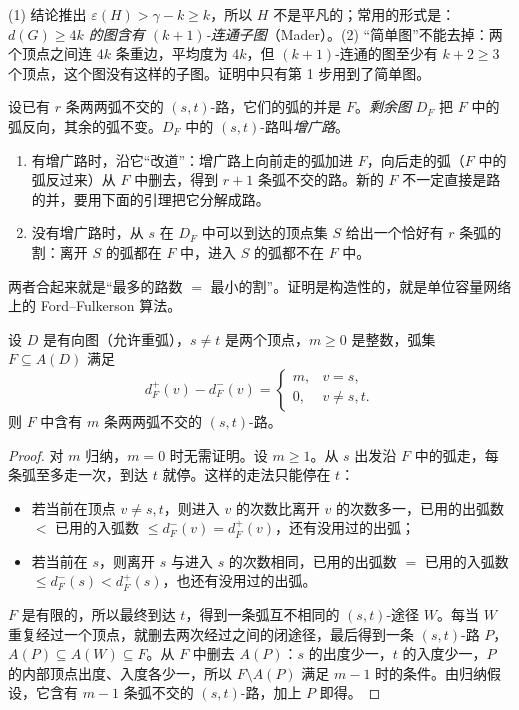 \begin{remark}
(1) 结论推出 $\varepsilon(H)>\gamma-k\geqslant k$，所以 $H$ 不是平凡的；常用的形式是：\emph{$d(G)\geqslant4k$ 的图含有 $(k+1)$-连通子图}（Mader）。(2) “简单图”不能去掉：两个顶点之间连 $4k$ 条重边，平均度为 $4k$，但 $(k+1)$-连通的图至少有 $k+2\geqslant3$ 个顶点，这个图没有这样的子图。证明中只有第 1 步用到了简单图。
\end{remark}


设已有 $r$ 条两两弧不交的 $(s,t)$-路，它们的弧的并是 $F$。\emph{剩余图} $D_F$ 把 $F$ 中的弧反向，其余的弧不变。$D_F$ 中的 $(s,t)$-路叫\emph{增广路}。
\begin{enumerate}
\item 有增广路时，沿它“改道”：增广路上向前走的弧加进 $F$，向后走的弧（$F$ 中的弧反过来）从 $F$ 中删去，得到 $r+1$ 条弧不交的路。新的 $F$ 不一定直接是路的并，要用下面的引理把它分解成路。
\item 没有增广路时，从 $s$ 在 $D_F$ 中可以到达的顶点集 $S$ 给出一个恰好有 $r$ 条弧的割：离开 $S$ 的弧都在 $F$ 中，进入 $S$ 的弧都不在 $F$ 中。
\end{enumerate}
两者合起来就是“最多的路数 $=$ 最小的割”。证明是构造性的，就是单位容量网络上的 Ford--Fulkerson 算法。

\begin{lemma}[按出入度差分解成路]\label{lem:yan-ch3-problems:decompose}
设 $D$ 是有向图（允许重弧），$s\neq t$ 是两个顶点，$m\geqslant0$ 是整数，弧集 $F\subseteq A(D)$ 满足
\[
d_F^+(v)-d_F^-(v)=\begin{cases}m,&v=s,\\0,&v\neq s,t.\end{cases}
\]
则 $F$ 中含有 $m$ 条两两弧不交的 $(s,t)$-路。
\end{lemma}
\begin{proof}
对 $m$ 归纳，$m=0$ 时无需证明。设 $m\geqslant1$。从 $s$ 出发沿 $F$ 中的弧走，每条弧至多走一次，到达 $t$ 就停。这样的走法只能停在 $t$：
\begin{itemize}
\item 若当前在顶点 $v\neq s,t$，则进入 $v$ 的次数比离开 $v$ 的次数多一，已用的出弧数 $<$ 已用的入弧数 $\leqslant d_F^-(v)=d_F^+(v)$，还有没用过的出弧；
\item 若当前在 $s$，则离开 $s$ 与进入 $s$ 的次数相同，已用的出弧数 $=$ 已用的入弧数 $\leqslant d_F^-(s)<d_F^+(s)$，也还有没用过的出弧。
\end{itemize}
$F$ 是有限的，所以最终到达 $t$，得到一条弧互不相同的 $(s,t)$-途径 $W$。每当 $W$ 重复经过一个顶点，就删去两次经过之间的闭途径，最后得到一条 $(s,t)$-路 $P$，$A(P)\subseteq A(W)\subseteq F$。从 $F$ 中删去 $A(P)$：$s$ 的出度少一，$t$ 的入度少一，$P$ 的内部顶点出度、入度各少一，所以 $F\setminus A(P)$ 满足 $m-1$ 时的条件。由归纳假设，它含有 $m-1$ 条弧不交的 $(s,t)$-路，加上 $P$ 即得。
\end{proof}

